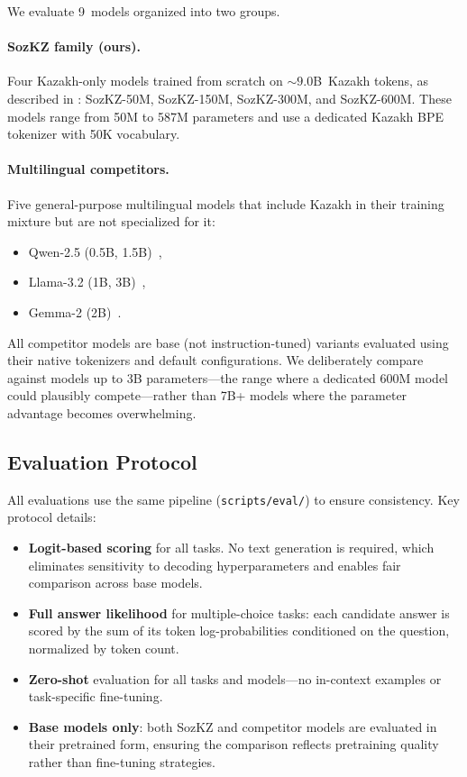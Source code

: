 We evaluate 9~models organized into two groups.

\paragraph{SozKZ family (ours).}
Four Kazakh-only models trained from scratch on ${\sim}9.0$B~Kazakh tokens,
as described in : SozKZ-50M, SozKZ-150M,
SozKZ-300M, and SozKZ-600M. These models range from 50M to 587M
parameters and use a dedicated Kazakh BPE tokenizer with 50K vocabulary.

\paragraph{Multilingual competitors.}
Five general-purpose multilingual models that include Kazakh in their training
mixture but are not specialized for it:
\begin{itemize}
  \item Qwen-2.5 (0.5B, 1.5B)~\citep{bai2023qwen},
  \item Llama-3.2 (1B, 3B)~\citep{touvron2023llama2},
  \item Gemma-2 (2B)~\citep{team2024gemma}.
\end{itemize}
All competitor models are base (not instruction-tuned) variants evaluated using
their native tokenizers and default configurations. We deliberately compare
against models up to 3B parameters---the range where a dedicated 600M model
could plausibly compete---rather than 7B+ models where the parameter advantage
becomes overwhelming.

\subsection{Evaluation Protocol}
\label{sec:protocol}

All evaluations use the same pipeline (\texttt{scripts/eval/}) to ensure
consistency. Key protocol details:

\begin{itemize}
  \item \textbf{Logit-based scoring} for all tasks. No text generation is
        required, which eliminates sensitivity to decoding hyperparameters
        and enables fair comparison across base models.
  \item \textbf{Full answer likelihood} for multiple-choice tasks: each
        candidate answer is scored by the sum of its token log-probabilities
        conditioned on the question, normalized by token count.
  \item \textbf{Zero-shot} evaluation for all tasks and models---no in-context
        examples or task-specific fine-tuning.
  \item \textbf{Base models only}: both SozKZ and competitor models are
        evaluated in their pretrained form, ensuring the comparison
        reflects pretraining quality rather than fine-tuning strategies.
\end{itemize}

